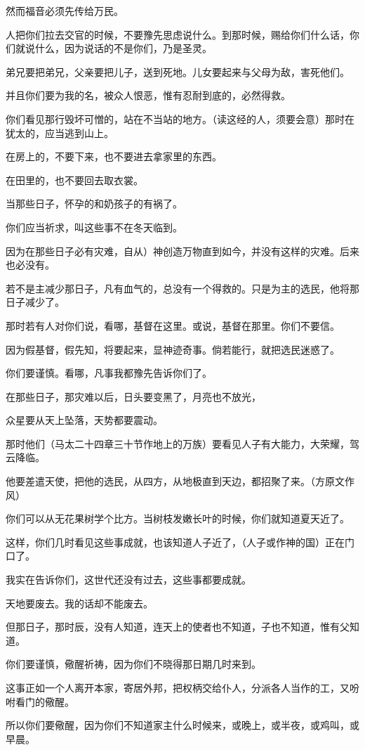 \documentclass[12pt,oneside]{book}
\begin{document}
然而福音必须先传给万民。

人把你们拉去交官的时候，不要豫先思虑说什么。到那时候，赐给你们什么话，你们就说什么，因为说话的不是你们，乃是圣灵。

弟兄要把弟兄，父亲要把儿子，送到死地。儿女要起来与父母为敌，害死他们。

并且你们要为我的名，被众人恨恶，惟有忍耐到底的，必然得救。

你们看见那行毁坏可憎的，站在不当站的地方。（读这经的人，须要会意）那时在犹太的，应当逃到山上。

在房上的，不要下来，也不要进去拿家里的东西。

在田里的，也不要回去取衣裳。

当那些日子，怀孕的和奶孩子的有祸了。

你们应当祈求，叫这些事不在冬天临到。

因为在那些日子必有灾难，自从）神创造万物直到如今，并没有这样的灾难。后来也必没有。

若不是主减少那日子，凡有血气的，总没有一个得救的。只是为主的选民，他将那日子减少了。

那时若有人对你们说，看哪，基督在这里。或说，基督在那里。你们不要信。

因为假基督，假先知，将要起来，显神迹奇事。倘若能行，就把选民迷惑了。

你们要谨慎。看哪，凡事我都豫先告诉你们了。

在那些日子，那灾难以后，日头要变黑了，月亮也不放光，

众星要从天上坠落，天势都要震动。

那时他们（马太二十四章三十节作地上的万族）要看见人子有大能力，大荣耀，驾云降临。

他要差遣天使，把他的选民，从四方，从地极直到天边，都招聚了来。（方原文作风）

你们可以从无花果树学个比方。当树枝发嫩长叶的时候，你们就知道夏天近了。

这样，你们几时看见这些事成就，也该知道人子近了，（人子或作神的国）正在门口了。

我实在告诉你们，这世代还没有过去，这些事都要成就。

天地要废去。我的话却不能废去。

但那日子，那时辰，没有人知道，连天上的使者也不知道，子也不知道，惟有父知道。

你们要谨慎，儆醒祈祷，因为你们不晓得那日期几时来到。

这事正如一个人离开本家，寄居外邦，把权柄交给仆人，分派各人当作的工，又吩咐看门的儆醒。

所以你们要儆醒，因为你们不知道家主什么时候来，或晚上，或半夜，或鸡叫，或早晨。
\end{document}
